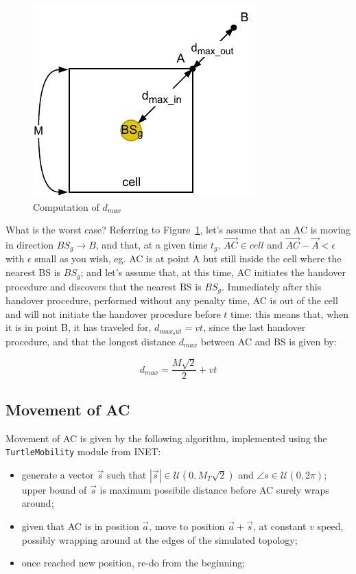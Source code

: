 \documentclass[a4paper,12pt]{article}
\begin{document}
\begin{figure}[H]
  \centering
  \includegraphics{img/dmax.pdf}
  \caption{Computation of $d_{max}$}
  \label{fig:dmax}
\end{figure}

What is the worst case? Referring to Figure~\ref{fig:dmax}, let's assume that an AC is moving in direction $BS_g \rightarrow B$, and that, at a given time $t_g$, $\overrightarrow{AC} \in cell$ and $\overrightarrow{AC} - \overrightarrow{A} < \epsilon$ with $\epsilon$ small as you wish, eg. AC is at point A but still inside the cell where the nearest BS is $BS_g$; and let's assume that, at this time, AC initiates the handover procedure and discovers that the nearest BS is $BS_g$. Immediately after this handover procedure, performed without any penalty time, AC is out of the cell and will not initiate the handover procedure before $t$ time: this means that, when it is in point B, it has traveled for, $d_{max_out} = v t$, since the last handover procedure, and that the longest distance $d_{max}$ between AC and BS is given by:

$$ d_{max} = \frac{M \sqrt{2}}{2} + vt $$

\subsection{Movement of AC}
Movement of AC is given by the following algorithm, implemented using the \texttt{TurtleMobility} module from INET:
\begin{itemize}
  \item generate a vector $\vec{s}$ such that $|\vec{s}| \in \mathcal{U}(0, M_{T}\sqrt{2})$ and $\angle{s} \in \mathcal{U}(0, 2\pi)$; upper bound of $\vec{s}$ is maximum possibile distance before AC surely wraps around;
  \item given that AC is in position $\vec{a}$, move to position $\vec{a} + \vec{s}$, at constant $v$ speed, possibly wrapping around at the edges of the simulated topology;
  \item once reached new position, re-do from the beginning;
\end{itemize}
\end{document}
